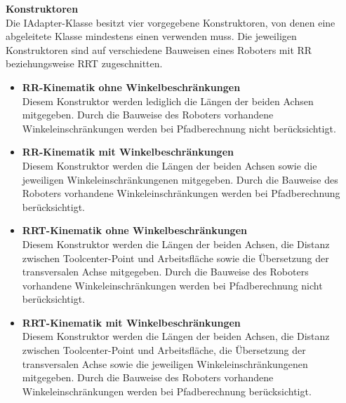 \textbf{Konstruktoren}\\
Die IAdapter-Klasse besitzt vier vorgegebene Konstruktoren, von denen eine abgeleitete Klasse mindestens einen verwenden muss. Die jeweiligen Konstruktoren sind auf verschiedene Bauweisen eines Roboters mit RR beziehungsweise RRT zugeschnitten.
\begin{itemize}
\item \textbf{RR-Kinematik ohne Winkelbeschränkungen}\\
Diesem Konstruktor werden lediglich die Längen der beiden Achsen mitgegeben. Durch die Bauweise des Roboters vorhandene Winkeleinschränkungen werden bei Pfadberechnung nicht berücksichtigt.
\item \textbf{RR-Kinematik mit Winkelbeschränkungen}\\
Diesem Konstruktor werden die Längen der beiden Achsen sowie die jeweiligen Winkeleinschränkungenen mitgegeben. Durch die Bauweise des Roboters vorhandene Winkeleinschränkungen werden bei Pfadberechnung berücksichtigt.
\item \textbf{RRT-Kinematik ohne Winkelbeschränkungen}\\
Diesem Konstruktor werden die Längen der beiden Achsen, die Distanz zwischen Toolcenter-Point und Arbeitsfläche sowie die Übersetzung der transversalen Achse mitgegeben. Durch die Bauweise des Roboters vorhandene Winkeleinschränkungen werden bei Pfadberechnung nicht berücksichtigt.
\item \textbf{RRT-Kinematik mit Winkelbeschränkungen}\\
Diesem Konstruktor werden die Längen der beiden Achsen, die Distanz zwischen Toolcenter-Point und Arbeitsfläche, die Übersetzung der transversalen Achse sowie die jeweiligen Winkeleinschränkungenen mitgegeben. Durch die Bauweise des Roboters vorhandene Winkeleinschränkungen werden bei Pfadberechnung berücksichtigt.
\end{itemize}

